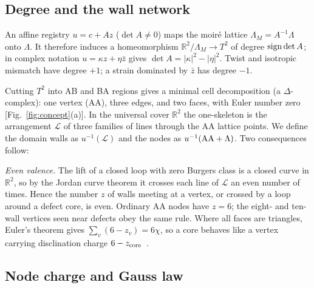 \documentclass[prb,twocolumn,superscriptaddress,floatfix,10pt]{revtex4-2}
\begin{document}
\subsection{Degree and the wall network}

An affine registry $u=c+Az$ ($\det A\ne0$) maps the moir\'e lattice $\Lambda_M=A^{-1}\Lambda$ onto $\Lambda$. It therefore induces a homeomorphism $\mathbb{R}^2/\Lambda_M\to T^2$ of degree ${\rm sign}\det A$; in complex notation $u=\kappa z+\eta\bar z$ gives $\det A=|\kappa|^2-|\eta|^2$. Twist and isotropic mismatch have degree $+1$; a strain dominated by $\bar z$ has degree $-1$.

Cutting $T^2$ into AB and BA regions gives a minimal cell decomposition (a $\Delta$-complex): one vertex (AA), three edges, and two faces, with Euler number zero [Fig.~\ref{fig:concept}(a)]. In the universal cover $\mathbb{R}^2$ the one-skeleton is the arrangement $\mathcal L$ of three families of lines through the AA lattice points. We define the domain walls as $u^{-1}(\mathcal L)$ and the nodes as $u^{-1}({\rm AA}+\Lambda)$. Two consequences follow:

\emph{Even valence.} The lift of a closed loop with zero Burgers class is a closed curve in $\mathbb{R}^2$, so by the Jordan curve theorem it crosses each line of $\mathcal L$ an even number of times. Hence the number $z$ of walls meeting at a vertex, or crossed by a loop around a defect core, is even. Ordinary AA nodes have $z=6$; the eight- and ten-wall vertices seen near defects obey the same rule. Where all faces are triangles, Euler's theorem gives $\sum_v(6-z_v)=6\chi$, so a core behaves like a vertex carrying disclination charge $6-z_{\rm core}$~\cite{Nelson2002,Kleman2008}.

\subsection{Node charge and Gauss law}
\end{document}
